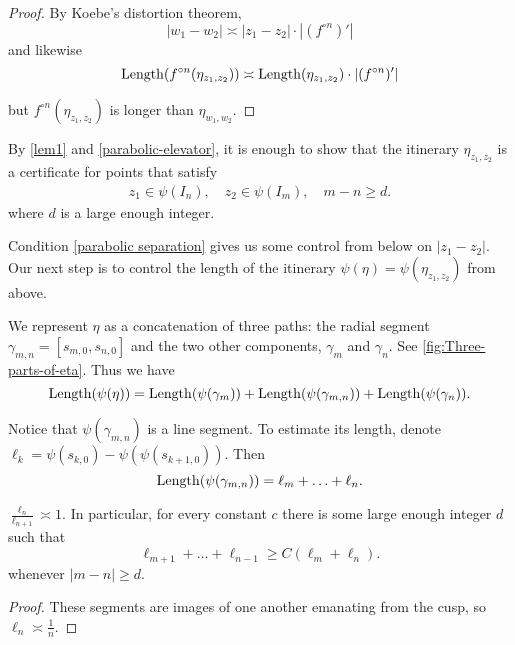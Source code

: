 \begin{proof}
By Koebe's distortion theorem,
\begin{equation*}
	|w_1-w_2| \asymp |z_1-z_2| \cdot |(f^{\circ n})'|
\end{equation*}
and likewise
\begin{equation*}
\operatorname{Length}(f^{\circ n}(\eta_{z_1,z_2})) \asymp \operatorname{Length}(\eta_{z_1,z_2}) \cdot |(f^{\circ n})'|
\end{equation*}

but $f^{\circ n}(\eta_{z_1,z_2})$ is longer than $\eta_{w_1,w_2}$.
\end{proof}

By \cref{lem1} and \cref{parabolic-elevator}, it is enough to show that the itinerary $\eta_{z_1,z_2}$ is a certificate for points that satisfy
\begin{align} \label{parabolic separation}
	z_1 \in \psi(I_n), \quad z_2 \in \psi(I_m), \quad m-n \geq d.
\end{align}
where $d$ is a large enough integer.

Condition \eqref{parabolic separation} gives us some control from below on $|z_1-z_2|$.
Our next step is to control the length of the itinerary $\psi(\eta)=\psi(\eta_{z_1,z_2})$ from above.

 

We represent $\eta$ as a concatenation of three paths: the radial segment $\gamma_{m,n}=[s_{m,0},s_{n,0}]$ and the two other components, $\gamma _m$ and $\gamma_n$. See \cref{fig:Three-parts-of-eta}.
Thus we have
\begin{equation}
	\operatorname{Length}(\psi(\eta))=\operatorname{Length}(\psi(\gamma_m))+\operatorname{Length}(\psi(\gamma_{m,n}))+\operatorname{Length}(\psi(\gamma_n)).
\end{equation}


Notice that $\psi(\gamma _{m,n})$ is a line segment. To estimate its length, denote $\ell_k = \psi(s_{k,0})-\psi(\psi(s_{k+1,0}))$. Then 
\begin{equation*}
\operatorname{Length}(\psi(\gamma_{m,n})) = \ell_m+\ldots+\ell_n.
\end{equation*}

\begin{lemma}
	$\frac{\ell_n}{\ell_{n+1}} \asymp 1$. In particular, for every constant $c$ there is some large enough integer $d$ such that
	\begin{equation*}
		\ell_{m+1}+\ldots+\ell_{n-1} \geq C (\ell_m+\ell_n).
	\end{equation*}
whenever $|m-n| \geq d$.
\end{lemma}
\begin{proof}
These segments are images of one another emanating from the cusp, so $\ell_n \asymp \frac 1n$.
\end{proof}

